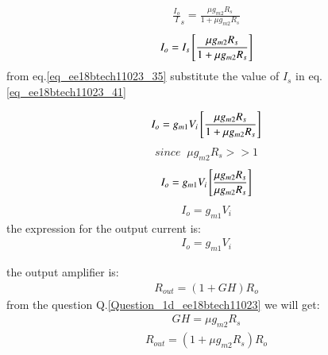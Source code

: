 \begin{enumerate}[label=\thesection.\arabic*.,ref=\thesection.\theenumi]
\begin{align}
    \frac{I_o}I_s{}  = \frac{\mu g_{m2}R_s}{1 + \mu g_{m2}R_s}
    \label{eq_ee18btech11023_40}
\end{align}
\begin{align}
    I_o = I_s{}\left[\frac{\mu g_{m2}R_s}{1 + \mu g_{m2}R_s}\right]
      \label{eq_ee18btech11023_41}
\end{align}
from eq.\ref{eq_ee18btech11023_35} substitute the value of $I_s$ in eq.\ref{eq_ee18btech11023_41}

\begin{align}
    I_o =  g_{m1} V_i{}\left[\frac{\mu g_{m2}R_s}{1 + \mu g_{m2}R_s}\right]
    \label{eq_ee18btech11023_42}
\end{align}
\begin{align*}
    since\;\; \mu g_{m2}R_s >> 1
\end{align*}
\begin{align}
    I_o =  g_{m1} V_i{}\left[\frac{\mu g_{m2}R_s}{ \mu g_{m2}R_s}\right]
    \label{eq_ee18btech11023_43}
\end{align}
\begin{align}
    I_o =  g_{m1} V_i
     \label{eq_ee18btech11023_44}
\end{align}
the expression for the output current is:
\begin{align}
    I_o =  g_{m1} V_i
     \label{eq_ee18btech11023_45}
\end{align}

the output amplifier is:
\begin{align}
    R_{out} = (1 + GH)R_o
    \label{eq_ee18btech11023_46}
\end{align}
from the question  Q.\ref{Question_1d_ee18btech11023} we will get:
\begin{align}
    GH = \mu g_{m2}R_s
    \label{eq_ee18btech11023_47}
\end{align}
\begin{align}
    R_{out} = (1 + \mu g_{m2}R_s)R_o
    \label{eq_ee18btech11023_48}
\end{align}


\end{enumerate}
